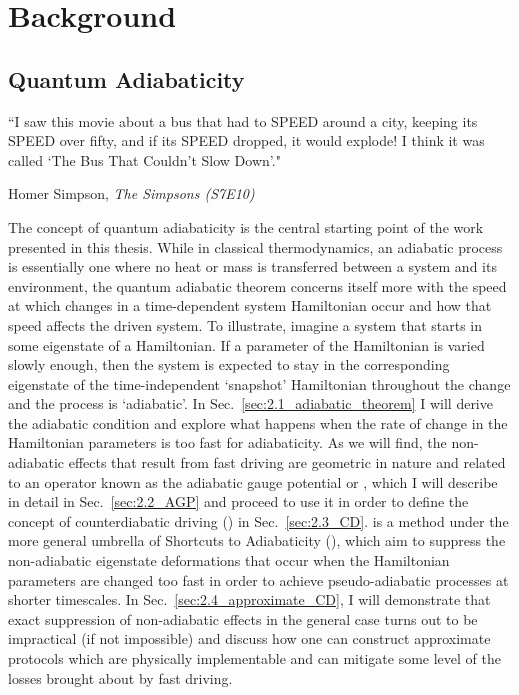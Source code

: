 \part{Background}
\chapter{Quantum Adiabaticity}\label{chap:2_adiabaticity}

\epigraph{``I saw this movie about a bus that had to SPEED around a city, keeping its SPEED over fifty, and if its SPEED dropped, it would explode! I think it was called `The Bus That Couldn’t Slow Down'."}{Homer Simpson, \emph{The Simpsons (S7E10)}}

    
The concept of quantum adiabaticity is the central starting point of the work presented in this thesis. While in classical thermodynamics, an adiabatic process is essentially one where no heat or mass is transferred between a system and its environment, the quantum adiabatic theorem concerns itself more with the speed at which changes in a time-dependent system Hamiltonian occur and how that speed affects the driven system. To illustrate, imagine a system that starts in some eigenstate of a Hamiltonian. If a parameter of the Hamiltonian is varied slowly enough, then the system is expected to stay in the corresponding eigenstate of the time-independent `snapshot' Hamiltonian throughout the change and the process is `adiabatic'. In Sec.~\ref{sec:2.1_adiabatic_theorem} I will derive the adiabatic condition and explore what happens when the rate of change in the Hamiltonian parameters is too fast for adiabaticity. As we will find, the non-adiabatic effects that result from fast driving are geometric in nature and related to an operator known as the adiabatic gauge potential \cite{kolodrubetz_geometry_2017, jarzynski_geometric_1995} or , which I will describe in detail in Sec.~\ref{sec:2.2_AGP} and proceed to use it in order to define the concept of counterdiabatic driving \cite{berry_transitionless_2009, demirplak_adiabatic_2003} () in Sec.~\ref{sec:2.3_CD}.  is a method under the more general umbrella of Shortcuts to Adiabaticity \cite{guery-odelin_shortcuts_2019} (), which aim to suppress the non-adiabatic eigenstate deformations that occur when the Hamiltonian parameters are changed too fast in order to achieve pseudo-adiabatic processes at shorter timescales. In Sec.~\ref{sec:2.4_approximate_CD}, I will demonstrate that exact suppression of non-adiabatic effects in the general case turns out to be impractical (if not impossible) and discuss how one can construct approximate  protocols which are physically implementable and can mitigate some level of the losses brought about by fast driving.
        
